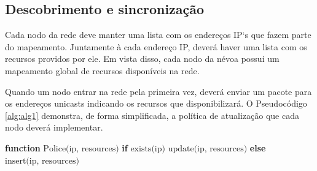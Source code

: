 
\subsection{Descobrimento e sincronização}

Cada nodo da rede deve manter uma lista com os endereços IP`s que fazem parte do mapeamento. Juntamente à cada endereço IP, deverá haver uma lista com os recursos providos por ele.
Em vista disso, cada nodo da névoa possui um mapeamento global de recursos disponíveis na rede.

Quando um nodo entrar na rede pela primeira vez, deverá enviar um pacote para os endereços unicasts indicando os recursos que disponibilizará.
O Pseudocódigo \ref{alg:alg1} demonstra, de forma simplificada, a política de atualização que cada nodo deverá implementar.


\begin{algorithm}[htb]
    \begin{center}
        \begin{algorithmic}[1]
            \STATE \textbf{function} $\text{Police(ip, resources)}$
            \STATE \hspace{\algorithmicindent} \textbf{if} $\text{exists(ip)}$
            \STATE \hspace{\algorithmicindent} \hspace{\algorithmicindent} $\text{update(ip, resources)}$
            \STATE \hspace{\algorithmicindent} \textbf{else}
            \STATE \hspace{\algorithmicindent} \hspace{\algorithmicindent} $\text{insert(ip, resources)}$
        \end{algorithmic}
    \end{center}
    \caption[Política de atualização de recursos]%
        {\label{alg:alg1} Política de atualização de recursos.}%
    \end{algorithm}



